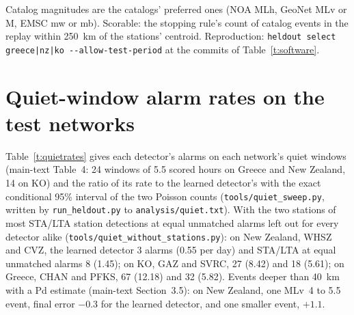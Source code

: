 \documentclass[11pt,a4paper]{article}
\newcommand{\stalta}{STA/LTA}
\newcommand{\tool}[1]{\nolinkurl{#1}}
\begin{document}
\begin{table}[htbp]
  \par\smallskip\footnotesize Catalog magnitudes are the catalogs' preferred ones (NOA
  MLh, GeoNet MLv or M, EMSC mw or mb). Scorable: the stopping rule's count of catalog
  events in the replay within 250~km of the stations' centroid. Reproduction:
  \tool{heldout select greece|nz|ko --allow-test-period} at the commits of Table~\ref{t:software}.
\end{table}

\clearpage
\section{Quiet-window alarm rates on the test networks}\label{s:quietrates}

Table~\ref{t:quietrates} gives each detector's alarms on each network's quiet
windows (main-text Table~4: 24 windows of 5.5 scored hours on Greece and New Zealand,
14 on KO) and the ratio of its rate to the learned detector's with the exact
conditional 95\% interval of the two Poisson counts
(\tool{tools/quiet_sweep.py}, written by \tool{run\_heldout.py} to
\tool{analysis/quiet.txt}). With the two stations of most \stalta{} station
detections at equal unmatched alarms left out for every detector alike
(\tool{tools/quiet_without_stations.py}): on New Zealand, WHSZ and CVZ, the learned
detector 3 alarms (0.55 per day) and \stalta{} at equal unmatched alarms 8 (1.45);
on KO, GAZ and SVRC, 27 (8.42) and 18 (5.61); on Greece, CHAN and PFKS, 67 (12.18) and 32 (5.82). Events deeper than 40~km with a Pd
estimate (main-text Section~3.5): on New Zealand, one MLv~4 to 5.5 event, final
error $-0.3$ for the learned detector, and one smaller event, $+1.1$.
\end{document}
